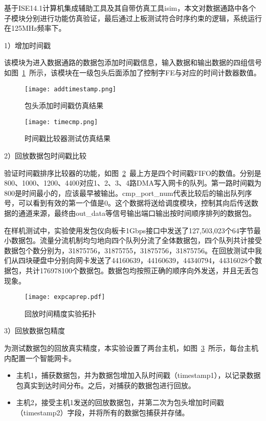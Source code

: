 基于ISE14.1计算机集成辅助工具及其自带仿真工具isim，本文对数据通路中各个子模块分别进行功能仿真验证，最后通过上板测试符合时序约束的逻辑，系统运行在125MHz频率下。

1）增加时间戳

该模块为进入数据通路的数据包添加时间戳信息，输入数据和输出数据的四组信号如图~\ref{fig:addtimestamp}~所示，该模块在一级包头后面添加了控制字FE与对应的时间计数器数值。

\begin{figure}[!ht]
	\centering 
	\texttt{[image: addtimestamp.png]}
	\caption{包头添加时间戳仿真结果} \label{fig:addtimestamp}
\end{figure}

\begin{figure}[!ht]
	\centering 
	\vspace{1.5mm} 
	\texttt{[image: timecmp.png]}
	\caption{时间戳比较器测试仿真结果} \label{fig:timecmp}
\end{figure}

2）回放数据包时间戳比较

验证时间戳排序比较器的功能，如图~\ref{fig:timecmp}~最上方是四个时间戳FIFO的数值。分别是800、1000、1200、4400对应1、2、3、4路DMA写入网卡的队列。第一路时间戳为800是时间最小的，应该最早被输出。cmp\_port\_num代表比较后的输出队列序号，可以看到有效的第一个值是0。这个数据将送给调度模块，控制其向后传送数据的通道来源，最终由out\_data等信号输出端口输出按时间顺序排列的数据包。

在样机测试中，实验使用发包仪向板卡1Gbps接口中发送了127,503,023个64字节最小数据包。流量分流机制均匀地向四个队列分流了全体数据包，四个队列共计接受数据包个数分别为，31875756，31875755，31875756，31875756。在回放测试中我们从四块硬盘中分别向网卡发送了44160639，44160639，44340794，44316028个数据包，共计176978100个数据包。数据包均按照正确的顺序向外发送，并且无丢包现象。

\begin{figure}[!ht]
	\centering 
	\vspace{-1.5mm} 
	\texttt{[image: expcaprep.pdf]}
	\caption{回放时间精度实验拓扑} \label{fig:expcaprep}
\end{figure}

3）回放数据包精度

为测试数据包的回放真实精度，本实验设置了两台主机，如图~\ref{fig:expcaprep}~所示，每台主机内配置一个智能网卡。

\begin{itemize}
	\item 主机1，捕获数据包，并为数据包增加入队时间戳（timestamp1），以记录数据包真实到达时间分布。之后，对捕获的数据包进行回放。
	\item 主机2，接受主机1发送的回放数据包，并第二次为包头增加时间戳（timestamp2）字段，并将所有的数据包捕获并存储。
\end{itemize}

